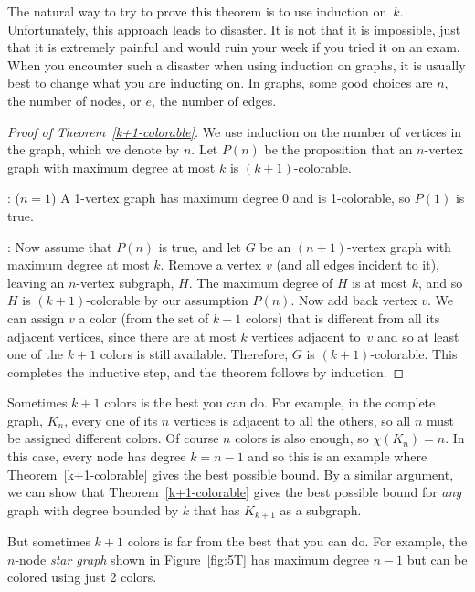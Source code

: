 The natural way to try to prove this theorem is to use induction
on~$k$.  Unfortunately, this approach leads to disaster.  It is not
that it is impossible, just that it is extremely painful and would
ruin your week if you tried it on an exam.  When you encounter such a
disaster when using induction on graphs, it is usually best to change
what you are inducting on.  In graphs, some good choices are $n$, the
number of nodes, or $e$, the number of edges.

\begin{proof}[Proof of Theorem~\ref{k+1-colorable}]
We use induction on the number of vertices in the graph, which we
denote by $n$.  Let $P(n)$ be the proposition that an $n$-vertex graph
with maximum degree at most $k$ is $(k+1)$-colorable.

: ($n=1$) A 1-vertex graph has maximum degree
0 and is 1-colorable, so $P(1)$ is true.

: Now assume that $P(n)$ is true, and
let $G$ be an $(n+1)$-vertex graph with maximum degree at most $k$.
Remove a vertex $v$ (and all edges incident to it), leaving an
$n$-vertex subgraph, $H$.  The maximum degree of $H$ is at most $k$,
and so $H$ is $(k+1)$-colorable by our assumption $P(n)$.  Now add
back vertex $v$.  We can assign $v$ a color (from the set of $k + 1$
colors) that is different from all its adjacent vertices, since there
are at most $k$ vertices adjacent to~$v$ and so at least one of the
$k+1$ colors is still available.  Therefore, $G$ is $(k+1)$-colorable.
This completes the inductive step, and the theorem follows by
induction.
\end{proof}

Sometimes $k+1$ colors is the best you can do.  For example, in the
complete graph, $K_n$, every one of its $n$ vertices is adjacent to
all the others, so all $n$ must be assigned different colors.  Of
course $n$ colors is also enough, so $\chi(K_n)=n$.  In this case,
every node has degree $k = n - 1$ and so this is an example where
Theorem~\ref{k+1-colorable} gives the best possible bound.  By a
similar argument, we can show that Theorem~\ref{k+1-colorable} gives
the best possible bound for \emph{any} graph with degree bounded by
$k$ that has $K_{k+1}$ as a subgraph.

But sometimes $k+1$ colors is far from the best that you can do.
For example, the $n$-node \emph{star graph} shown in
Figure~\ref{fig:5T} has maximum degree $n - 1$ but can be colored
using just 2 colors.

